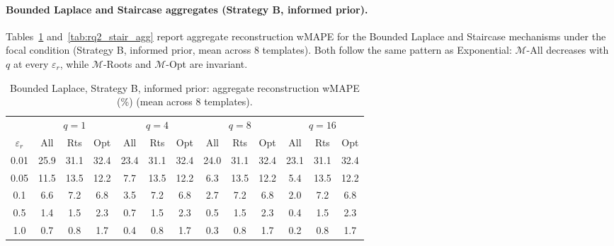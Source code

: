\paragraph{Bounded Laplace and Staircase aggregates (Strategy B, informed prior).}
Tables~\ref{tab:rq2_blap_agg} and~\ref{tab:rq2_stair_agg} report aggregate reconstruction wMAPE for the Bounded Laplace and Staircase mechanisms under the focal condition (Strategy B, informed prior, mean across 8 templates). Both follow the same pattern as Exponential: $\mathcal{M}$-All decreases with $q$ at every $\varepsilon_r$, while $\mathcal{M}$-Roots and $\mathcal{M}$-Opt are invariant.

\begin{table}[h]
\centering
\setlength{\tabcolsep}{2.5pt}
\small
\caption{Bounded Laplace, Strategy B, informed prior: aggregate reconstruction wMAPE (\%) (mean across 8 templates).}
\label{tab:rq2_blap_agg}
\begin{tabular}{c|ccc|ccc|ccc|ccc}
\toprule
& \multicolumn{3}{c|}{$q=1$} & \multicolumn{3}{c|}{$q=4$} & \multicolumn{3}{c|}{$q=8$} & \multicolumn{3}{c}{$q=16$} \\
$\varepsilon_r$ & All & Rts & Opt & All & Rts & Opt & All & Rts & Opt & All & Rts & Opt \\
\midrule
0.01 & 25.9 & 31.1 & 32.4 & 23.4 & 31.1 & 32.4 & 24.0 & 31.1 & 32.4 & 23.1 & 31.1 & 32.4 \\
0.05 & 11.5 & 13.5 & 12.2 & 7.7  & 13.5 & 12.2 & 6.3  & 13.5 & 12.2 & 5.4  & 13.5 & 12.2 \\
0.1  & 6.6  & 7.2  & 6.8  & 3.5  & 7.2  & 6.8  & 2.7  & 7.2  & 6.8  & 2.0  & 7.2  & 6.8 \\
0.5  & 1.4  & 1.5  & 2.3  & 0.7  & 1.5  & 2.3  & 0.5  & 1.5  & 2.3  & 0.4  & 1.5  & 2.3 \\
1.0  & 0.7  & 0.8  & 1.7  & 0.4  & 0.8  & 1.7  & 0.3  & 0.8  & 1.7  & 0.2  & 0.8  & 1.7 \\
\bottomrule
\end{tabular}
\end{table}

